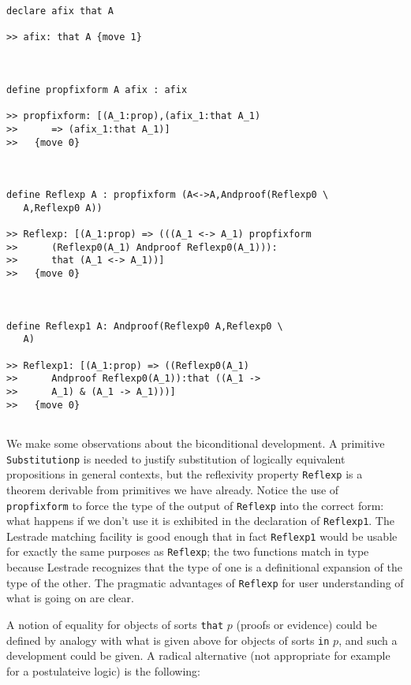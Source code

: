 \documentclass[12pt]{article}
\begin{document}
\begin{verbatim}
declare afix that A

>> afix: that A {move 1}



define propfixform A afix : afix

>> propfixform: [(A_1:prop),(afix_1:that A_1)
>>      => (afix_1:that A_1)]
>>   {move 0}



define Reflexp A : propfixform (A<->A,Andproof(Reflexp0 \
   A,Reflexp0 A))

>> Reflexp: [(A_1:prop) => (((A_1 <-> A_1) propfixform
>>      (Reflexp0(A_1) Andproof Reflexp0(A_1))):
>>      that (A_1 <-> A_1))]
>>   {move 0}



define Reflexp1 A: Andproof(Reflexp0 A,Reflexp0 \
   A)

>> Reflexp1: [(A_1:prop) => ((Reflexp0(A_1)
>>      Andproof Reflexp0(A_1)):that ((A_1 ->
>>      A_1) & (A_1 -> A_1)))]
>>   {move 0}


\end{verbatim}

We make some observations about the biconditional development.  A primitive {\tt Substitutionp} is needed to justify substitution of logically equivalent propositions in general contexts, but the reflexivity property {\tt Reflexp} is a theorem derivable from primitives we have already.  Notice the use of {\tt propfixform} to force the type of the output of {\tt Reflexp} into the correct form:  what happens if we don't use it is exhibited in  the declaration of {\tt Reflexp1}.  The Lestrade matching facility is good enough that in fact {\tt Reflexp1} would be usable for exactly the same purposes as {\tt Reflexp};  the two functions match in type because Lestrade recognizes that the type of one is a definitional expansion of the type of the other.  The pragmatic advantages of {\tt Reflexp} for user understanding of what is going on are clear.

A notion of equality for objects of sorts {\tt that} $p$ (proofs or evidence) could be defined by analogy with what is given above for objects of sorts
{\tt in} $p$, and such a development could be given.  A radical alternative (not appropriate for example for a postulateive logic) is the following:
\end{document}
